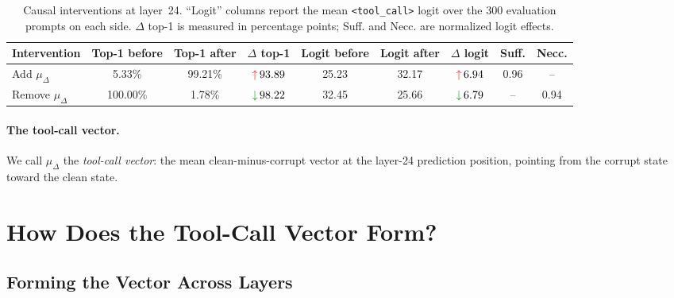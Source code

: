 \documentclass{article}
\begin{document}
\begin{table}[h]
\centering
\small
\caption{Causal interventions at layer~24. ``Logit'' columns report the mean \texttt{<tool\_call>} logit over the 300 evaluation prompts on each side. $\Delta$ top-1 is measured in percentage points; Suff. and Necc. are normalized logit effects.}
\label{tab:shared-direction}
\setlength{\tabcolsep}{3.5pt}
\begin{tabularx}{\linewidth}{>{\raggedright\arraybackslash}Xcccccccc}
\toprule
Intervention & Top-1 before & Top-1 after & $\Delta$ top-1 & Logit before & Logit after & $\Delta$ logit & Suff. & Necc. \\
\midrule
Add $\mu_\Delta$ & 5.33\% & 99.21\% & $\textcolor{red}{\uparrow}\,93.89$ & 25.23 & 32.17 & $\textcolor{red}{\uparrow}\,6.94$ & 0.96 & -- \\
Remove $\mu_\Delta$ & 100.00\% & 1.78\% & $\textcolor{green!60!black}{\downarrow}\,98.22$ & 32.45 & 25.66 & $\textcolor{green!60!black}{\downarrow}\,6.79$ & -- & 0.94 \\
\bottomrule
\end{tabularx}
\end{table}

\paragraph{The tool-call vector.}
We call $\mu_\Delta$ the \emph{tool-call vector}: the mean
clean-minus-corrupt vector at the layer-24 prediction position, pointing from the corrupt state toward the clean state.

\section{How Does the Tool-Call Vector Form?}
\label{sec:formation}

\subsection{Forming the Vector Across Layers}
\label{sec:which}
\end{document}
